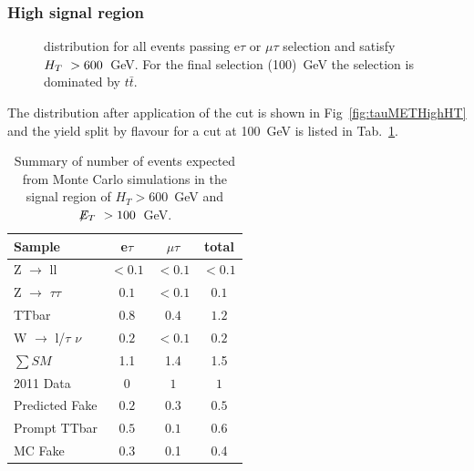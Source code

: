 \subsubsection{High \HT signal region}
\begin{figure}[hbtp]
  \hfill
  \caption{\MET distribution for all events passing e$\tau$ or $\mu\tau$ selection and satisfy $H_T~> 600$~GeV. For the final \MET selection (100)~GeV the selection is dominated by $t\bar{t}$.}
\end{figure}

The \MET distribution after application of the \HT
cut is shown in Fig~\ref{fig:tauMETHighHT} and
the yield split by flavour for a cut at 100~GeV is listed in Tab.~\ref{tab:tauHighHT}.

\begin{table}[htb]
\begin{center}
\caption{\label{tab:tauHighHT}\protect Summary of number of events expected from Monte Carlo simulations in 
the signal region of $H_T> 600$~GeV and $\displaystyle{\not} E_T~> 100$~GeV.}
\begin{tabular}{l|c c |c}
Sample & e$\tau$ & $\mu\tau$ & total\\
\hline
Z $\rightarrow$ ll & $< 0.1$ & $< 0.1$ & $< 0.1$\\
Z $\rightarrow$ $\tau$$\tau$ & $0.1$ & $< 0.1$ & $0.1$\\
TTbar & $0.8$ & $0.4$ & $1.2$\\
W $\rightarrow$ l/$\tau$ $\nu$ & $0.2$ & $< 0.1$ & $0.2$\\
$\sum SM$ & 1.1 & 1.4 & 1.5\\
\hline
2011 Data & $0$ & $1$ & $1$\\
\hline
\hline
Predicted Fake & $0.2$ & $0.3$ & $0.5$\\
Prompt TTbar  & $0.5$ & $0.1$ & $0.6$\\
\hline
MC Fake & 0.3 & 0.1 & 0.4\\
\end{tabular}
\end{center}
\end{table}

